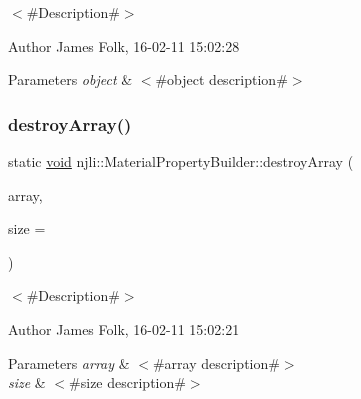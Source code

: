 $<$\#\+Description\#$>$ 

\begin{DoxyAuthor}{Author}
James Folk, 16-\/02-\/11 15\+:02\+:28
\end{DoxyAuthor}

\begin{DoxyParams}{Parameters}
{\em object} & $<$\#object description\#$>$ \\
\hline
\end{DoxyParams}
\mbox{\label{classnjli_1_1_material_property_builder_a8d1b1085258fbf72fef04cc3e7dcfdc0}} 
\subsubsection{\texorpdfstring{destroy\+Array()}{destroyArray()}}
{\footnotesize\ttfamily static \mbox{\hyperlink{_thread_8h_af1e856da2e658414cb2456cb6f7ebc66}{void}} njli\+::\+Material\+Property\+Builder\+::destroy\+Array (\begin{DoxyParamCaption}\item[{\mbox{\hyperlink{classnjli_1_1_material_property_builder}{Material\+Property\+Builder}} $\ast$$\ast$}]{array,  }\item[{const \mbox{\hyperlink{_util_8h_a10e94b422ef0c20dcdec20d31a1f5049}{u32}}}]{size = {} }\end{DoxyParamCaption})\hspace{0.3cm}{\ttfamily [static]}}



$<$\#\+Description\#$>$ 

\begin{DoxyAuthor}{Author}
James Folk, 16-\/02-\/11 15\+:02\+:21
\end{DoxyAuthor}

\begin{DoxyParams}{Parameters}
{\em array} & $<$\#array description\#$>$ \\
\hline
{\em size} & $<$\#size description\#$>$ \\
\hline
\end{DoxyParams}
\mbox{\label{classnjli_1_1_material_property_builder_ad525b4ddef84c344f680eae7c3f6d78a}} 
